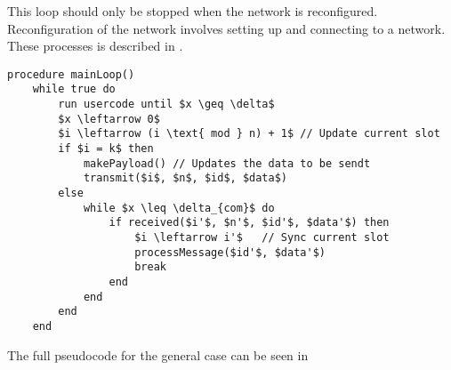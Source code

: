 
This loop should only be stopped when the network is reconfigured. 
Reconfiguration of the network involves setting up and connecting to a network. 
These processes is described in .

\begin{minipage}{\linewidth} %
\begin{lstlisting}[style=pseudocode,mathescape=true,caption={Pseudocode example of the main loop}] 
procedure mainLoop()
	while true do
		run usercode until $x \geq \delta$
		$x \leftarrow 0$
		$i \leftarrow (i \text{ mod } n) + 1$ // Update current slot
		if $i = k$ then
			makePayload() // Updates the data to be sendt
			transmit($i$, $n$, $id$, $data$)
		else 
			while $x \leq \delta_{com}$ do
				if received($i'$, $n'$, $id'$, $data'$) then
					$i \leftarrow i'$	// Sync current slot
					processMessage($id'$, $data'$)
					break
				end
			end
		end 
	end
\end{lstlisting}  
\end{minipage}

The full pseudocode for the general case can be seen in 


            